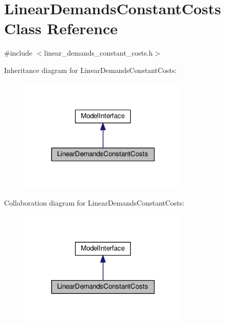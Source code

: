 \hypertarget{classLinearDemandsConstantCosts}{}\section{Linear\+Demands\+Constant\+Costs Class Reference}
\label{classLinearDemandsConstantCosts}


{\ttfamily \#include $<$linear\+\_\+demands\+\_\+constant\+\_\+costs.\+h$>$}



Inheritance diagram for Linear\+Demands\+Constant\+Costs\+:\nopagebreak
\begin{figure}[H]
\begin{center}
\leavevmode
\includegraphics[width=231pt]{classLinearDemandsConstantCosts__inherit__graph}
\end{center}
\end{figure}


Collaboration diagram for Linear\+Demands\+Constant\+Costs\+:\nopagebreak
\begin{figure}[H]
\begin{center}
\leavevmode
\includegraphics[width=231pt]{classLinearDemandsConstantCosts__coll__graph}
\end{center}
\end{figure}
